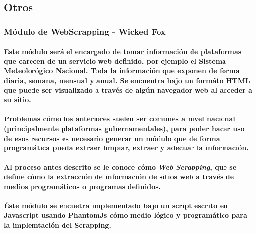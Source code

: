   \subsection{Otros}
    \subsubsection{Módulo de WebScrapping - Wicked Fox}
    \paragraph{Este módulo será el encargado de tomar información de plataformas que carecen de un servicio web definido, por ejemplo el Sistema Meteolorógico Nacional. Toda la información que exponen de forma diaria, semana, mensual y anual. Se encuentra bajo un formáto HTML que puede ser visualizado a través de algún navegador web al acceder a su sitio.}
    \paragraph{Problemas cómo los anteriores suelen ser comunes a nivel nacional (principalmente plataformas gubernamentales), para poder hacer uso de esos recursos es necesario generar un módulo que de forma programática pueda extraer limpiar, extraer y adecuar la información.}
    \paragraph{Al proceso antes descrito se le conoce cómo \emph{Web Scrapping}\cite{6}, que se define cómo la extracción de información de sitios web a través de medios programáticos o programas definidos.}
    \paragraph{Éste módulo se encuetra implementado bajo un script escrito en Javascript usando PhantomJs cómo medio lógico y programático para la implemtación del Scrapping.}
